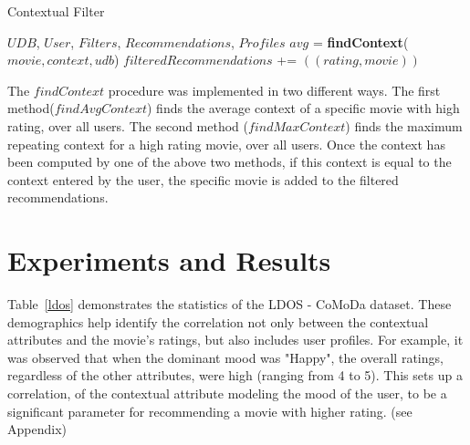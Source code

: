 \documentclass{article}
\begin{document}
\begin{algorithm}[tb]
   \caption{Contextual Filter}
   \label{Contextual Filtering of Collaborative Filtering results}
\begin{algorithmic}
    $UDB$, $User$, $Filters$, $Recommendations$, $Profiles$
   \STATE $avg$ = {\bfseries findContext}($movie, context, udb$)
   \STATE $filteredRecommendations$ += $((rating, movie))$
   \ENDIF   
   \ENDIF
   \ENDFOR
   \ENDIF
   \ENDFOR
\end{algorithmic}
\end{algorithm}

The $findContext$ procedure was implemented in two different ways. The first method($findAvgContext$) finds the average context of a specific movie with high rating, over all users. The second method ($findMaxContext$) finds the maximum repeating context for a high rating movie, over all users. Once the context has been computed by one of the above two methods, if this context is equal to the context entered by the user, the specific movie is added to the filtered recommendations.


\section{Experiments and Results}
Table~\ref{ldos} demonstrates the statistics of the LDOS - CoMoDa dataset. These demographics help identify the correlation not only between the contextual attributes and the movie's ratings, but also includes user profiles. For example, it was observed that when the dominant mood was "Happy", the overall ratings, regardless of the other attributes, were high (ranging from 4 to 5). This sets up a correlation, of the contextual attribute modeling the mood of the user, to be a significant parameter for recommending a movie with higher rating. (see Appendix)
\end{document}
